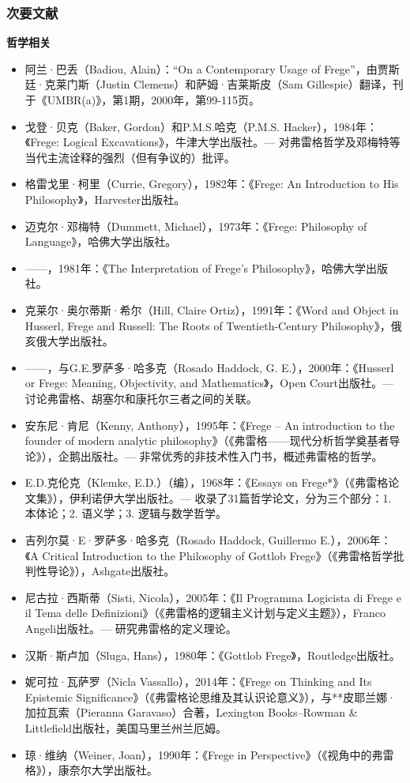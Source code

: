 \subsubsection{次要文献}  
\textbf{哲学相关} 
\begin{itemize}
\item 阿兰·巴丢（Badiou, Alain）：“On a Contemporary Usage of Frege”，由贾斯廷·克莱门斯（Justin Clemens）和萨姆·吉莱斯皮（Sam Gillespie）翻译，刊于《UMBR(a)》，第1期，2000年，第99-115页。  
\item 戈登·贝克（Baker, Gordon）和P.M.S.哈克（P.M.S. Hacker），1984年：《Frege: Logical Excavations》，牛津大学出版社。— 对弗雷格哲学及邓梅特等当代主流诠释的强烈（但有争议的）批评。  
\item 格雷戈里·柯里（Currie, Gregory），1982年：《Frege: An Introduction to His Philosophy》，Harvester出版社。  
\item 迈克尔·邓梅特（Dummett, Michael），1973年：《Frege: Philosophy of Language》，哈佛大学出版社。  
\item ——，1981年：《The Interpretation of Frege's Philosophy》，哈佛大学出版社。  
\item 克莱尔·奥尔蒂斯·希尔（Hill, Claire Ortiz），1991年：《Word and Object in Husserl, Frege and Russell: The Roots of Twentieth-Century Philosophy》，俄亥俄大学出版社。  
\item ——，与G.E.罗萨多·哈多克（Rosado Haddock, G. E.），2000年：《Husserl or Frege: Meaning, Objectivity, and Mathematics》，Open Court出版社。— 讨论弗雷格、胡塞尔和康托尔三者之间的关联。
\item 安东尼·肯尼（Kenny, Anthony），1995年：《Frege – An introduction to the founder of modern analytic philosophy》（《弗雷格——现代分析哲学奠基者导论》），企鹅出版社。— 非常优秀的非技术性入门书，概述弗雷格的哲学。  
\item E.D.克伦克（Klemke, E.D.）（编），1968年：《Essays on Frege*》（《弗雷格论文集》），伊利诺伊大学出版社。— 收录了31篇哲学论文，分为三个部分：1. 本体论；2. 语义学；3. 逻辑与数学哲学。  
\item 吉列尔莫·E·罗萨多·哈多克（Rosado Haddock, Guillermo E.），2006年：《A Critical Introduction to the Philosophy of Gottlob Frege》（《弗雷格哲学批判性导论》），Ashgate出版社。  
\item 尼古拉·西斯蒂（Sisti, Nicola），2005年：《Il Programma Logicista di Frege e il Tema delle Definizioni》（《弗雷格的逻辑主义计划与定义主题》），Franco Angeli出版社。— 研究弗雷格的定义理论。  
\item 汉斯·斯卢加（Sluga, Hans），1980年：《Gottlob Frege》，Routledge出版社。  
\item 妮可拉·瓦萨罗（Nicla Vassallo），2014年：《Frege on Thinking and Its Epistemic Significance》（《弗雷格论思维及其认识论意义》），与**皮耶兰娜·加拉瓦索（Pieranna Garavaso）合著，Lexington Books–Rowman & Littlefield出版社，美国马里兰州兰厄姆。  
\item 琼·维纳（Weiner, Joan），1990年：《Frege in Perspective》（《视角中的弗雷格》），康奈尔大学出版社。
\end{itemize}